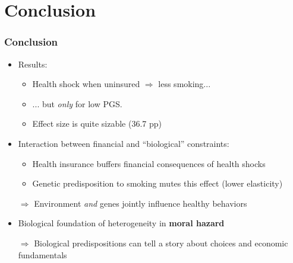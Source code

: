 \documentclass[10pt,compress,xcolor=dvipsnames]{beamer}    %
\newcounter{ex}
\newcommand{\1}[1]{\mathrm{1\hspace*{-2.5pt}l}[#1]}	%
\begin{document}
\section{Conclusion}

\begin{frame} \frametitle{Conclusion}
\begin{itemize}
	\item Results:
	\begin{itemize}
		\item Health shock when uninsured $\Rightarrow$ less smoking...
		\item ... but \textit{only} for low PGS.
		\item Effect size is quite sizable (36.7 pp)
	\end{itemize}

	\vspace{3ex}

	\item Interaction between financial and ``biological'' constraints:
	\begin{itemize}
		\item Health insurance buffers financial consequences of health shocks
		\item Genetic predisposition to smoking mutes this effect (lower elasticity)
	\end{itemize}

	\item[$\Rightarrow$] Environment \emph{and} genes jointly influence healthy behaviors

	\vspace{3ex}

	\item Biological foundation of heterogeneity in \textbf{moral hazard} \cite{Einav2013}
	\item[$\Rightarrow$] Biological predispositions can tell a story about choices and economic fundamentals

\end{itemize}
\end{frame}

\begin{frame}
\begin{center}
{\Huge \color{Verde}{Thank you}}
\end{center}
\end{frame}
\end{document}
